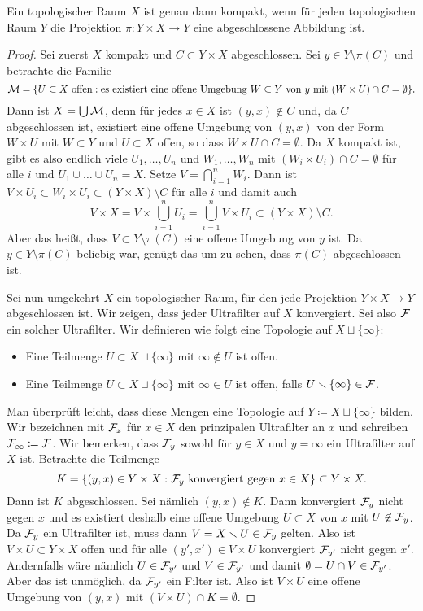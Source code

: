 \begin{theorem}\label{thm:compactness-properness}
  Ein topologischer Raum $X$ ist genau dann kompakt, wenn für jeden topologischen Raum $Y$ die Projektion $\pi\colon Y\times X\to Y$ eine abgeschlossene Abbildung ist.
\end{theorem}
\begin{proof}
  Sei zuerst $X$ kompakt und $C\subset Y\times X$ abgeschlossen. Sei $y\in Y\setminus\pi(C)$ und betrachte die Familie
  \[
    \cal M = \{ \text{$U\subset X$ offen} : \text{es existiert eine offene Umgebung $W\subset Y$ von $y$ mit $(W\times U)\cap C = \emptyset$}\}.
  \]
  Dann ist $X = \bigcup\cal M$, denn für jedes $x\in X$ ist $(y, x)\not\in C$ und, da $C$ abgeschlossen ist, existiert eine offene Umgebung von $(y,x)$ von der Form $W\times U$ mit $W\subset Y$ und $U\subset X$ offen, so dass $W\times U\cap C=\emptyset$. Da $X$ kompakt ist, gibt es also endlich viele $U_1,\dots, U_n$ und $W_1,\dots, W_n$ mit $(W_i\times U_i)\cap C = \emptyset$ für alle $i$ und $U_1\cup\dots\cup U_n = X$. Setze $V = \bigcap_{i=1}^n W_i$. Dann ist $V\times U_i\subset W_i\times U_i\subset (Y\times X)\setminus C$ für alle $i$ und damit auch
  \[
    V\times X = V\times\bigcup_{i=1}^n U_i = \bigcup_{i=1}^n V\times U_i\subset (Y\times X)\setminus C.
  \]
  Aber das heißt, dass $V\subset Y\setminus\pi(C)$ eine offene Umgebung von $y$ ist. Da $y\in Y\setminus\pi(C)$ beliebig war, genügt das um zu sehen, dass $\pi(C)$ abgeschlossen ist.

  Sei nun umgekehrt $X$ ein topologischer Raum, für den jede Projektion $Y\times X\to Y$ abgeschlossen ist. Wir zeigen, dass jeder Ultrafilter auf $X$ konvergiert. Sei also $\cal F$ ein solcher Ultrafilter. Wir definieren wie folgt eine Topologie auf $X\sqcup\{\infty\}$:
  \begin{itemize}
    \item Eine Teilmenge $U\subset X\sqcup\{\infty\}$ mit $\infty \not\in U$ ist offen.
    \item Eine Teilmenge $U\subset X\sqcup\{\infty\}$ mit $\infty\in U$ ist offen, falls $U\setminus\{\infty\}\in\cal F$.
  \end{itemize}
  Man überprüft leicht, dass diese Mengen eine Topologie auf $Y\coloneqq X\sqcup\{\infty\}$ bilden. Wir bezeichnen mit $\cal F_x$ für $x\in X$ den prinzipalen Ultrafilter an $x$ und schreiben $\cal F_\infty \coloneqq \cal F$. Wir bemerken, dass $\cal F_y$ sowohl für $y\in X$ und $y = \infty$ ein Ultrafilter auf $X$ ist. Betrachte die Teilmenge
  \[
    K = \{ (y,x)\in Y\times X : \text{$\cal F_y$ konvergiert gegen $x\in X$} \} \subset Y\times X.
  \]
  Dann ist $K$ abgeschlossen. Sei nämlich $(y,x)\not\in K$. Dann konvergiert $\cal F_y$ nicht gegen $x$ und es existiert deshalb eine offene Umgebung $U\subset X$ von $x$ mit $U\not\in\cal F_y$. Da $\cal F_y$ ein Ultrafilter ist, muss dann $V = X\setminus U\in\cal F_y$ gelten. Also ist $V\times U\subset Y\times X$ offen und für alle $(y', x')\in V\times U$ konvergiert $\cal F_{y'}$ nicht gegen $x'$. Andernfalls wäre nämlich $U\in\cal F_{y'}$ und $V\in\cal F_{y'}$ und damit $\emptyset = U\cap V\in\cal F_{y'}$. Aber das ist unmöglich, da $\cal F_{y'}$ ein Filter ist. Also ist $V\times U$ eine offene Umgebung von $(y,x)$ mit $(V\times U)\cap K = \emptyset$.


\end{proof}
